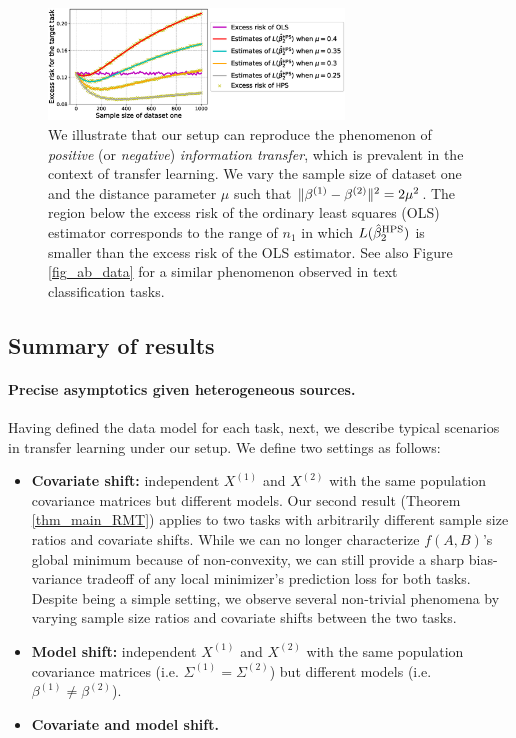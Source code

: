 \begin{figure}
    \centering
    \includegraphics[width=0.7\textwidth]{figures/motivation.eps}
    \caption{We illustrate that our setup can reproduce the phenomenon of \textit{positive} (or \textit{negative}) \textit{information transfer}, which is prevalent in the context of transfer learning.
    We vary the sample size of dataset one and the distance parameter $\mu$ such that $\|\beta^{(1)} - \beta^{(2)}\|^2 = 2\mu^2$. The region below the excess risk of the ordinary least squares (OLS) estimator corresponds to the range of $n_1$ in which $L(\hat{\beta}_2^{\textup{HPS}})$ is smaller than the excess risk of the OLS estimator. See also Figure \ref{fig_ab_data} for a similar phenomenon observed in text classification tasks.}
    \label{fig_motivation}
\end{figure}

\subsection{Summary of results}

\paragraph{Precise asymptotics given heterogeneous sources.}
Having defined the data model for each task, next, we describe typical scenarios in transfer learning under our setup.
We define two settings as follows:
\begin{itemize}
    \item \textbf{Covariate shift:}
    independent $X^{(1)}$ and $X^{(2)}$ with the same population covariance matrices but different models.
    Our second result (Theorem \ref{thm_main_RMT}) applies to two tasks with arbitrarily different sample size ratios and covariate shifts.
    While we can no longer characterize $f(A, B)$'s global minimum because of non-convexity, we can still provide a sharp bias-variance tradeoff of any local minimizer's prediction loss for both tasks.
    Despite being a simple setting, we observe several non-trivial phenomena by varying sample size ratios and covariate shifts between the two tasks.
    \item \textbf{Model shift:} independent $X^{(1)}$ and $X^{(2)}$ with the same population covariance matrices (i.e. $\Sigma^{(1)}=\Sigma^{(2)}$) but different models (i.e. $\beta^{(1)} \neq \beta^{(2)}$).
    \item \textbf{Covariate and model shift.}
\end{itemize}

